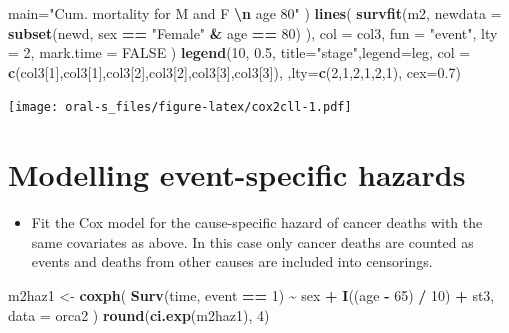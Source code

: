 \documentclass[
]{book}
\newenvironment{Shaded}{\begin{snugshade}}{\end{snugshade}}
\newcommand{\AttributeTok}[1]{\textcolor[rgb]{0.13,0.29,0.53}{#1}}
\newcommand{\ConstantTok}[1]{\textcolor[rgb]{0.56,0.35,0.01}{#1}}
\newcommand{\DecValTok}[1]{\textcolor[rgb]{0.00,0.00,0.81}{#1}}
\newcommand{\FloatTok}[1]{\textcolor[rgb]{0.00,0.00,0.81}{#1}}
\newcommand{\FunctionTok}[1]{\textcolor[rgb]{0.13,0.29,0.53}{\textbf{#1}}}
\newcommand{\NormalTok}[1]{#1}
\newcommand{\OtherTok}[1]{\textcolor[rgb]{0.56,0.35,0.01}{#1}}
\newcommand{\SpecialCharTok}[1]{\textcolor[rgb]{0.81,0.36,0.00}{\textbf{#1}}}
\newcommand{\StringTok}[1]{\textcolor[rgb]{0.31,0.60,0.02}{#1}}
\providecommand{\tightlist}{%
  \setlength{\itemsep}{0pt}\setlength{\parskip}{0pt}}
\begin{document}
\begin{Shaded}
\begin{Highlighting}[]
   \AttributeTok{main=}\StringTok{"Cum. mortality for M and F }\SpecialCharTok{\textbackslash{}n}\StringTok{ age 80"}
\NormalTok{)}
\FunctionTok{lines}\NormalTok{(}
  \FunctionTok{survfit}\NormalTok{(m2, }\AttributeTok{newdata =} \FunctionTok{subset}\NormalTok{(newd, sex }\SpecialCharTok{==} \StringTok{"Female"} \SpecialCharTok{\&}\NormalTok{ age }\SpecialCharTok{==} \DecValTok{80}\NormalTok{)  ),}
  \AttributeTok{col =}\NormalTok{ col3, }\AttributeTok{fun =} \StringTok{"event"}\NormalTok{, }\AttributeTok{lty =} \DecValTok{2}\NormalTok{, }\AttributeTok{mark.time =} \ConstantTok{FALSE}
\NormalTok{)}
\FunctionTok{legend}\NormalTok{(}\DecValTok{10}\NormalTok{, }\FloatTok{0.5}\NormalTok{, }\AttributeTok{title=}\StringTok{"stage"}\NormalTok{,}\AttributeTok{legend=}\NormalTok{leg,}
       \AttributeTok{col =} \FunctionTok{c}\NormalTok{(col3[}\DecValTok{1}\NormalTok{],col3[}\DecValTok{1}\NormalTok{],col3[}\DecValTok{2}\NormalTok{],col3[}\DecValTok{2}\NormalTok{],col3[}\DecValTok{3}\NormalTok{],col3[}\DecValTok{3}\NormalTok{]),}
\NormalTok{        ,}\AttributeTok{lty=}\FunctionTok{c}\NormalTok{(}\DecValTok{2}\NormalTok{,}\DecValTok{1}\NormalTok{,}\DecValTok{2}\NormalTok{,}\DecValTok{1}\NormalTok{,}\DecValTok{2}\NormalTok{,}\DecValTok{1}\NormalTok{), }\AttributeTok{cex=}\FloatTok{0.7}\NormalTok{)}
\end{Highlighting}
\end{Shaded}

\texttt{[image: oral-s\_files/figure-latex/cox2cll-1.pdf]}

\section{Modelling event-specific hazards}\label{modelling-event-specific-hazards}

\begin{itemize}
\tightlist
\item
  Fit the Cox model for the cause-specific hazard of cancer deaths
  with the same covariates as above. In this case
  only cancer deaths are counted as events and deaths from other causes
  are included into censorings.
\end{itemize}

\begin{Shaded}
\begin{Highlighting}[]
\NormalTok{m2haz1 }\OtherTok{\textless{}{-}} 
  \FunctionTok{coxph}\NormalTok{(}
    \FunctionTok{Surv}\NormalTok{(time, event }\SpecialCharTok{==} \DecValTok{1}\NormalTok{) }\SpecialCharTok{\textasciitilde{}}\NormalTok{ sex }\SpecialCharTok{+} \FunctionTok{I}\NormalTok{((age }\SpecialCharTok{{-}} \DecValTok{65}\NormalTok{) }\SpecialCharTok{/} \DecValTok{10}\NormalTok{) }\SpecialCharTok{+}\NormalTok{ st3, }
    \AttributeTok{data =}\NormalTok{ orca2}
\NormalTok{  )}
\FunctionTok{round}\NormalTok{(}\FunctionTok{ci.exp}\NormalTok{(m2haz1), }\DecValTok{4}\NormalTok{)}
\end{Highlighting}
\end{Shaded}
\end{document}
